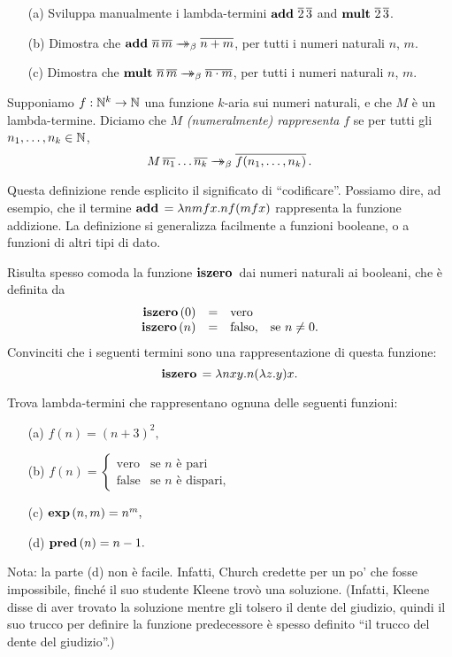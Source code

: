\documentclass{article}
\begin{document}
\begin{exercise}
  \begin{enumerate}
  \item[(a)] Sviluppa manualmente i lambda-termini
    $\mathop{\textbf{\bf add}\,}\mathop{\overline{2}}\mathop{\overline{3}}$ and $\mathop{\textbf{\bf mult}\,}\mathop{\overline{2}}\mathop{\overline{3}}$.
  \item[(b)] Dimostra che $\mathop{\textbf{\bf add}\,}\mathop{\overline{n}}\mathop{\overline{m}}\mathrel{\rightarrow\!\!\!\!\!\rightarrow}_{\beta}\mathop{\overline{n+m}}$,
    per tutti i numeri naturali $n$, $m$.
  \item[(c)] Dimostra che
    $\mathop{\textbf{\bf mult}\,}\mathop{\overline{n}}\mathop{\overline{m}}\mathrel{\rightarrow\!\!\!\!\!\rightarrow}_{\beta}\mathop{\overline{n\cdot m}}$, per tutti i numeri
    naturali $n$, $m$.
  \end{enumerate}
\end{exercise}

\begin{definition}
  Supponiamo $f:\mathbb{N}^k\to \mathbb{N}$ una funzione $k$-aria sui numeri naturali,
  e che $M$ \`e un lambda-termine. Diciamo che $M$ {\em (numeralmente)
    rappresenta} $f$ se per tutti gli $n_1,\ldots,n_k\in\mathbb{N}$,
  \[ M\mathop{\overline{n_1}}\ldots\mathop{\overline{n_k}} \mathrel{\rightarrow\!\!\!\!\!\rightarrow}_{\beta} \mathop{\overline{f(n_1,\ldots,n_k)}}.
  \]
\end{definition}

Questa definizione rende esplicito il significato di ``codificare''.
Possiamo dire, ad esempio, che il termine $\mathop{\textbf{\bf add}\,} = \lambda nmfx.nf(mfx)$
rappresenta la funzione addizione. La definizione si generalizza facilmente
a funzioni booleane, o a funzioni di altri tipi di dato.

Risulta spesso comoda la funzione $\mathop{\textbf{\bf iszero}\,}$ dai numeri naturali ai booleani,
che \`e definita da
\[ \begin{array}{rcll}
  \mathop{\textbf{\bf iszero}\,}(0) &=& \mbox{vero} \\
  \mathop{\textbf{\bf iszero}\,}(n) &=& \mbox{falso,} & \mbox{se $n\neq 0$.}
\end{array}
\]
Convinciti che i seguenti termini sono una rappresentazione
di questa funzione:
\[ \mathop{\textbf{\bf iszero}\,} = \lambda nxy.n(\lambda z.y)x. \]

\begin{exercise}
  Trova lambda-termini che rappresentano ognuna delle seguenti funzioni:
  \begin{enumerate}
  \item[(a)] 
    $ f(n)=(n+3)^2, $
  \item[(b)] 
    $  f(n)=\left\{\begin{array}{ll}\mbox{vero}&\mbox{se
          $n$ \`e pari}\\\mbox{false}&\mbox{se $n$ \`e dispari,}
      \end{array}\right. 
    $
  \item[(c)] 
    $ \mathop{\textbf{\bf exp}\,}(n,m)=n^m, $
  \item[(d)] 
    $ \mathop{\textbf{\bf pred}\,}(n)=n-1. $
  \end{enumerate}
  Nota: la parte (d) non \`e facile. Infatti, Church credette per
  un po' che fosse impossibile, finché il suo studente Kleene trov\`o una soluzione.
  (Infatti, Kleene disse di aver trovato la soluzione mentre gli tolsero
  il dente del giudizio, quindi il suo trucco per definire la funzione predecessore
  \`e spesso definito ``il trucco del dente del giudizio''.)
\end{exercise}
\end{document}
